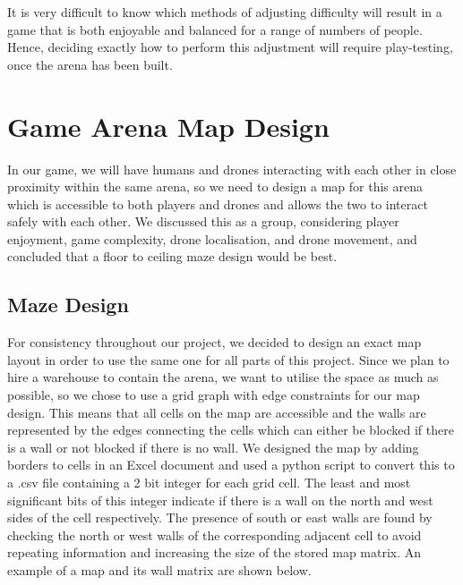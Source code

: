 \documentclass{report_template_oxford}
\begin{document}
\noindent It is very difficult to know which methods of adjusting difficulty will result in a game that is both enjoyable and balanced for a range of numbers of people. Hence, deciding exactly how to perform this adjustment will require play-testing, once the arena has been built.
\newpage


\section{Game Arena Map Design} \label{map}
In our game, we will have humans and drones interacting with each other in close proximity within the same arena, so we need to design a map for this arena which is accessible to both players and drones and allows the two to interact safely with each other. We discussed this as a group, considering player enjoyment, game complexity, drone localisation, and drone movement, and concluded that a floor to ceiling maze design would be best.

\subsection{Maze Design}
For consistency throughout our project, we decided to design an exact map layout in order to use the same one for all parts of this project. Since we plan to hire a warehouse to contain the arena, we want to utilise the space as much as possible, so we chose to use a grid graph with edge constraints for our map design. This means that all cells on the map are accessible and the walls are represented by the edges connecting the cells which can either be blocked if there is a wall or not blocked if there is no wall. We designed the map by adding borders to cells in an Excel document and used a python script to convert this to a .csv file containing a 2 bit integer for each grid cell. The least and most significant bits of this integer indicate if there is a wall on the north and west sides of the cell respectively. The presence of south or east walls are found by checking the north or west walls of the corresponding adjacent cell to avoid repeating information and increasing the size of the stored map matrix. An example of a map and its wall matrix are shown below.
\end{document}
